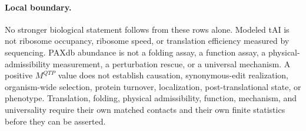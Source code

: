 \paragraph{Local boundary.}
No stronger biological statement follows from these rows alone.  Modeled tAI is not ribosome occupancy, ribosome speed, or translation efficiency measured by sequencing.  PAXdb abundance is not a folding assay, a function assay, a physical-admissibility measurement, a perturbation rescue, or a universal mechanism.  A positive $M^{QTP}$ value does not establish causation, synonymous-edit realization, organism-wide selection, protein turnover, localization, post-translational state, or phenotype.  Translation, folding, physical admissibility, function, mechanism, and universality require their own matched contacts and their own finite statistics before they can be asserted.

